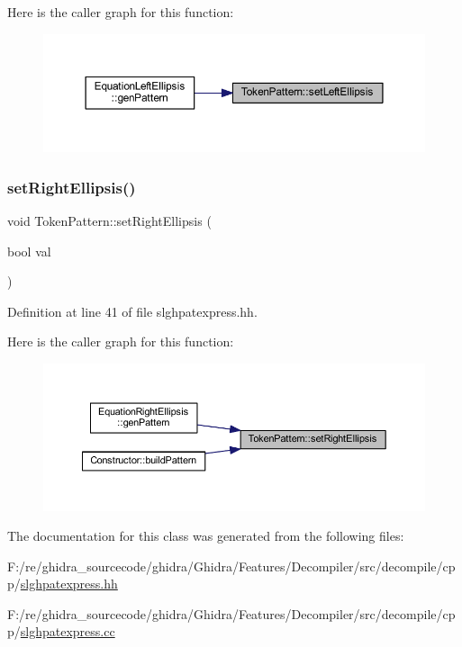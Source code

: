 Here is the caller graph for this function\+:
\nopagebreak
\begin{figure}[H]
\begin{center}
\leavevmode
\includegraphics[width=350pt]{class_token_pattern_a04ac201bbf0e434339f22808273a02f9_icgraph}
\end{center}
\end{figure}
\mbox{\label{class_token_pattern_a445e515457a5a7b1541f1b2007a0eac4}} 
\subsubsection{\texorpdfstring{setRightEllipsis()}{setRightEllipsis()}}
{\footnotesize\ttfamily void Token\+Pattern\+::set\+Right\+Ellipsis (\begin{DoxyParamCaption}\item[{bool}]{val }\end{DoxyParamCaption})\hspace{0.3cm}{\ttfamily [inline]}}



Definition at line 41 of file slghpatexpress.\+hh.

Here is the caller graph for this function\+:
\nopagebreak
\begin{figure}[H]
\begin{center}
\leavevmode
\includegraphics[width=350pt]{class_token_pattern_a445e515457a5a7b1541f1b2007a0eac4_icgraph}
\end{center}
\end{figure}


The documentation for this class was generated from the following files\+:\begin{DoxyCompactItemize}
\item 
F\+:/re/ghidra\+\_\+sourcecode/ghidra/\+Ghidra/\+Features/\+Decompiler/src/decompile/cpp/\mbox{\hyperlink{slghpatexpress_8hh}{slghpatexpress.\+hh}}\item 
F\+:/re/ghidra\+\_\+sourcecode/ghidra/\+Ghidra/\+Features/\+Decompiler/src/decompile/cpp/\mbox{\hyperlink{slghpatexpress_8cc}{slghpatexpress.\+cc}}\end{DoxyCompactItemize}
